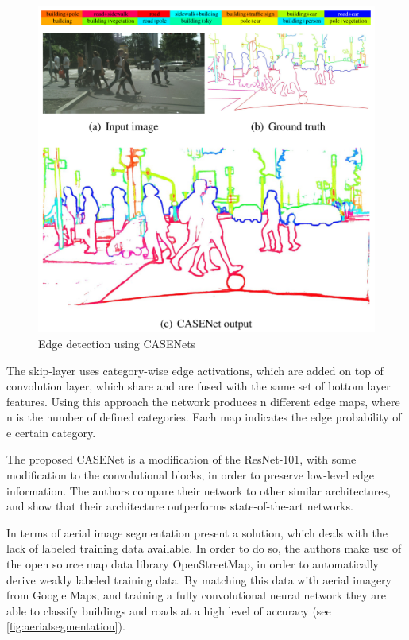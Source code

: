 \begin{figure}[!h]
	\centering
	\includegraphics[scale=0.4]{fig/casenet_edge_detection.png}
	\caption{Edge detection using CASENets \citep{Yu2017}}
	\label{fig:casenet}
\end{figure}

The skip-layer uses category-wise edge activations, which are added on top of convolution layer, which share and are fused with the same set of bottom layer features. Using this approach the network produces n different edge maps, where n is the number of defined categories. Each map indicates the edge probability of e certain category.

The proposed CASENet is a modification of the ResNet-101, with some modification to the convolutional blocks, in order to preserve low-level edge information. The authors compare their network to other similar architectures, and show that their architecture outperforms state-of-the-art networks.

In terms of aerial image segmentation \cite{Kaiser2017} present a solution, which deals with the lack of labeled training data available. In order to do so, the authors make use of the open source map data library OpenStreetMap, in order to automatically derive weakly labeled training data. By matching this data with aerial imagery from Google Maps, and training a fully convolutional neural network they are able to classify buildings and roads at a high level of accuracy (see \autoref{fig:aerialsegmentation}).

